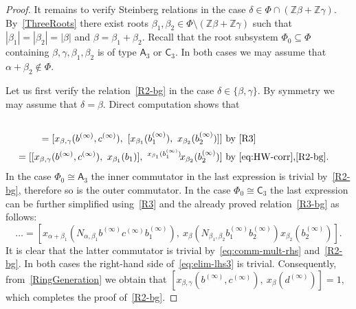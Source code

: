\documentclass{article}
\numberwithin{equation}{section}
\theoremstyle{definition}
\theoremstyle{remark}
\newcommand{\ZZ}{\mathbb{Z}}
\newcommand{\up}[2]{{^{#1}\!{#2}}}
\newcommand{\rA}{\mathsf{A}}
\newcommand{\rC}{\mathsf{C}}
\begin{document}
\begin{proof}
 It remains to verify Steinberg relations in the case \(\delta \in \Phi \cap (\ZZ \beta + \ZZ \gamma)\).
 By~\cref{ThreeRoots} there exist roots \(\beta_1, \beta_2 \in \Phi \setminus (\ZZ \beta + \ZZ \gamma)\) such that \(|\beta_1| = |\beta_2| = |\beta|\) and \(\beta = \beta_1 + \beta_2\). 
 Recall that the root subsystem $\Phi_0 \subseteq \Phi$ containing $\beta,\gamma,\beta_1,\beta_2$ is of type $\rA_3$ or $\rC_3$. 
 In both cases we may assume that $\alpha + \beta_2 \not\in\Phi$.
 
 Let us first verify the relation~\eqref{R2-bg} in the case $\delta \in \{\beta, \gamma\}$. By symmetry we may assume that $\delta = \beta$. 
 Direct computation shows that
 \begin{align}
  [x_{\beta,\gamma}(b^{(\infty)}, c^{(\infty)}),\ x_\beta(N_{\beta_1, \beta_2} b_1^{(\infty)}b_2^{(\infty)})] \nonumber \\
   = [x_{\beta,\gamma}(b^{(\infty)}, c^{(\infty)}),\ [x_{\beta_1}(b_1^{(\infty)}),\ x_{\beta_2}(b_2^{(\infty)})]]  & \text{ by~\eqref{R3}} \label{eq:elim-lhs3} \\ 
   = [[x_{\beta, \gamma}(b^{(\infty)}, c^{(\infty)}),\ x_{\beta_1}(b_1)],\ \up{x_{\beta_1}(b_1^{(\infty)})} x_{\beta_2}(b_2^{(\infty)})]  & \text{ by~\eqref{eq:HW-corr},\eqref{R2-bg}.} \nonumber \end{align}
In the case $\Phi_0\cong \rA_3$ the inner commutator in the last expression is trivial by~\eqref{R2-bg},
 therefore so is the outer commutator.
In the case $\Phi_0\cong \rC_3$ the last expression can be further simplified using~\eqref{R3} and the already proved relation~\eqref{R3-bg} as follows:
\[ \ldots = [x_{\alpha+\beta_1}(N_{\alpha, \beta_1} b^{(\infty)}c^{(\infty)}b_1^{(\infty)}),\ x_{\beta}(N_{\beta_1, \beta_2} b_1^{(\infty)} b_2^{(\infty)}) x_{\beta_2}(b_2^{(\infty)})]. \]
It is clear that the latter commutator is trivial by~\eqref{eq:comm-mult-rhs} and~\eqref{R2-bg}.  
  In both cases the right-hand side of~\eqref{eq:elim-lhs3} is trivial. Consequently, from~\cref{RingGeneration} we obtain that
 $[x_{\beta,\gamma}(b^{(\infty)}, c^{(\infty)}),\ x_\beta(d^{(\infty)})] = 1,$
 which completes the proof of~\eqref{R2-bg}. 
 

\end{proof}
\end{document}
